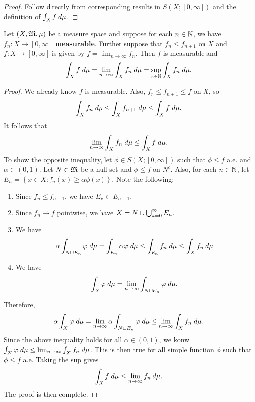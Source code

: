 \documentclass[a4paper]{article}
\begin{document}
\begin{proof}
Follow directly from corresponding results in $S(X; [0, \infty])$
and the definition of $\int_X f \; d \mu$.
\end{proof}

\begin{thm}
Let $(X, \mathfrak{M}, \mu)$ be a measure space and suppose for
each $n \in \mathbb{N}$, we have $f_n :
X \to [0, \infty]$ \textbf{measurable}. Further suppose
that $f_n \leq f_{n+1}$ on $X$ and $f: X \to [0, \infty]$
is given by $f = \lim_{n \to \infty} f_n$. Then
$f$ is measurable and
\[
\int_X f \; d \mu = \lim_{n \to \infty} \int_X f_n \; d \mu
= \sup_{n \in \mathbb{N}} \int_X f_n \; d \mu.
\]
\end{thm}

\begin{proof}
We already know $f$ is measurable. Also, $f_n \leq f_{n+1}
\leq f$ on $X$, so
\[
\int_X f_n \; d \mu \leq \int_X f_{n+1} \; d \mu \leq
\int_X f \; d \mu.
\]
It follows that
\[
\lim_{n \to \infty} \int_X f_n \; d \mu \leq \int_X f \; d \mu.
\]
To show the opposite inequality, let
$\phi \in S(X; [0, \infty])$ such that $\phi \leq f$ a.e.
and $\alpha \in (0, 1)$. Let $N \in \mathfrak{M}$ be a null set
and $\phi \leq f$ on $N^c$. Also, for each $n \in \mathbb{N}$, let
$E_n = \left\{ x \in X : f_n(x) \geq \alpha \phi(x) \right\}$.
Note the following:
\begin{enumerate}
  \item Since $f_n \leq f_{n+1}$, we have $E_n \subset E_{n+1}$.
  \item Since $f_n \to f$ pointwise, we have $X = N \cup \bigcup_{n=0}^\infty
  E_n$.
  \item We have
  \[
  \alpha \int_{N \cup E_n} \varphi \; d \mu
  = \int_{E_n} \alpha \varphi \; d \mu
  \leq \int_{E_n} f_n \; d \mu
  \leq \int_X f_n \; d \mu
  \]
  \item We have
  \[
  \int_X \varphi \; d \mu
  = \lim_{n \to \infty} \int_{N \cup E_n} \varphi \; d \mu.
  \]
\end{enumerate}
Therefore,
\[
\alpha \int_X \varphi \; d \mu
= \lim_{n \to \infty} \alpha \int_{N \cup E_n} \varphi \; d \mu
\leq \lim_{n \to \infty} \int_X f_n \; d \mu.
\]
Since the above inequality holds for all $\alpha \in (0, 1)$,
we konw $\int_X \varphi \; d \mu \leq \lim_{n \to \infty}
\int_X f_n \; d \mu$. This is then true for all simple function
$\phi$ such that $\phi \leq f$ a.e. Taking the sup
gives
\[
\int_X f \; d \mu \leq \lim_{n \to \infty} f_n \; d \mu.
\]
The proof is then complete.
\end{proof}
\end{document}
